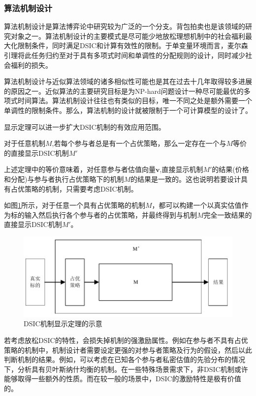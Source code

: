 \documentclass[promaster]{thesis-uestc}
\begin{document}
\subsubsection{算法机制设计}
算法机制设计是算法博弈论中研究较为广泛的一个分支。背包拍卖也是该领域的研究对象之一。算法机制设计的主要模式是尽可能少地放松理想机制中的社会福利最大化限制条件，同时满足DSIC和计算有效性的限制。于单变量环境而言，麦尔森引理将此任务归约至对于具有多项式时间和单调性的分配规则的设计，同时减少社会福利的损失。

算法机制设计与近似算法领域的诸多相似性可能也是其在过去十几年取得较多进展的原因之一。近似算法的主要研究目标是为NP-hard问题设计一种尽可能最优的多项式时间算法。算法机制设计往往也有类似的目标，唯一不同之处是额外需要一个单调性的限制条件。那么，算法机制的设计就被限制于一个可计算模型的设计了。

显示定理可以进一步扩大DSIC机制的有效应用范围。

\begin{theorem}[DSIC机制的显示定理]
对于任意机制$M$,若每个参与者总是有一个占优策略，那么一定存在一个与$M$等价的直接显示DSIC机制$M'$
\end{theorem}

上述定理中的等价意味着，对任意参与者估值向量$\mathbf{v}$,直接显示机制$M'$的结果(价格和分配)与参与者执行占优策略下的机制$M$的结果是一致的。这也说明若要设计具有占优策略的机制，只需要考虑DSIC机制。

如图\ref{revelation}所示，对于任意一个具有占优策略的机制$M$，都可以构建一个以真实估值作为标的输入然后执行各个参与者的占优策略，并最终得到与机制$M$完全一致结果的直接显示DSIC机制$M'$。

\begin{figure}[h]
    \includegraphics{pic/revelation.pdf}
    \caption{DSIC机制显示定理的示意}
    \label{revelation}
\end{figure}

若考虑放松DSIC的特性，会损失掉机制的强激励属性。例如在参与者不具有占优策略的机制中，机制设计者需要设定更强的对参与者策略及行为的假设，然后以此判断机制的结果。例如，可以考虑在已知各个参与者私密估值的先验分布的情况下，分析具有贝叶斯纳什均衡的机制。在一些特殊场景需求下，非DSIC机制或许能够取得一些额外的性质。而在较一般的场景中，DSIC的激励特性是极有价值的。
\end{document}
